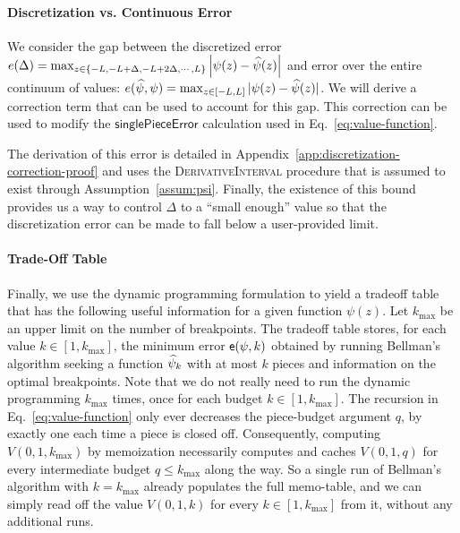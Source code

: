 \paragraph{Discretization vs. Continuous Error}  We consider the gap between the discretized error $e(\Delta) = \max_{z \in \{ -L, -L + \Delta, -L + 2 \Delta, \cdots, L\}} \left| \psi(z) - \widehat{\psi}(z) \right| $ and error over the entire continuum of values: $e(\widehat{\psi}, \psi) = \max_{z \in [-L, L]} | \psi(z) - \widehat{\psi}(z) |$. We will derive a correction term that can be used to account for this gap. This correction can be used to modify the $\mathsf{singlePieceError}$ calculation used in Eq.~\eqref{eq:value-function}.

The derivation of this error is detailed  in Appendix~\ref{app:discretization-correction-proof} and uses the \textsc{DerivativeInterval} procedure that is assumed to exist through Assumption~\ref{assum:psi}. Finally, the existence of this bound  provides us a way to control  $\Delta$ to a ``small enough'' value so that the discretization error can be made to fall below a user-provided limit. 


\paragraph{Trade-Off Table} Finally, we use the dynamic programming formulation to yield a tradeoff table that has the following useful information for a given function $\psi(z)$. Let $k_{\max}$ be an upper limit on the number of breakpoints. The tradeoff table stores, for each value $k \in [1, k_{\max}]$, the minimum error $\mathsf{e}(\psi, k)$ obtained by running Bellman's algorithm seeking a function $\widehat{\psi}_k$ with at most  $k$ pieces and information on the optimal breakpoints. Note that we do not really need to run the dynamic programming $k_{\max}$ times, once for each budget $k \in [1, k_{\max}]$. The recursion in Eq.~\eqref{eq:value-function} only ever decreases the piece-budget argument $q$, by exactly one each time a piece is closed off. Consequently, computing $V(0, 1, k_{\max})$ by memoization necessarily computes and caches $V(0, 1, q)$ for every intermediate budget $q \leq k_{\max}$ along the way. So a single run of Bellman's algorithm with $k = k_{\max}$ already populates the full memo-table, and we can simply read off the value $V(0, 1, k)$ for every $k \in [1, k_{\max}]$ from it, without any additional runs.
